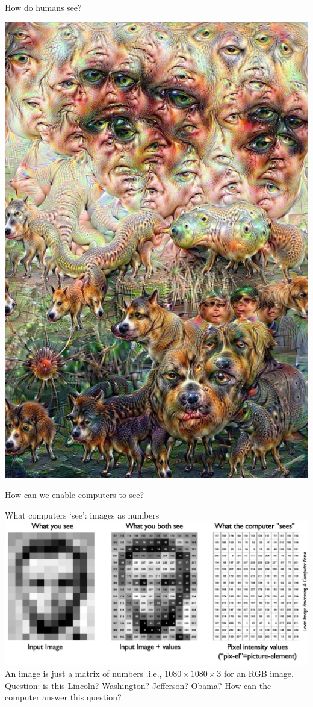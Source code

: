\documentclass[default, aspectratio=169]{beamer}
\begin{document}
\begin{frame}{How do humans see?}
\begin{center}
			\includegraphics[keepaspectratio, scale=0.25]{pic/nothing.PNG}
		\end{center}
		How can we enable computers to see?
	\end{frame}
	\begin{frame}{What computers ‘see’: images as numbers}
		\centering
		\includegraphics[keepaspectratio, scale=0.35]{pic/what.png}
		\\{An image is just a matrix of numbers .i.e., $1080 \times 1080 \times 3$ for an RGB image.\\ Question: is this Lincoln? Washington? Jefferson? Obama?
			How can the computer answer this question?}
	\end{frame}
\end{document}
